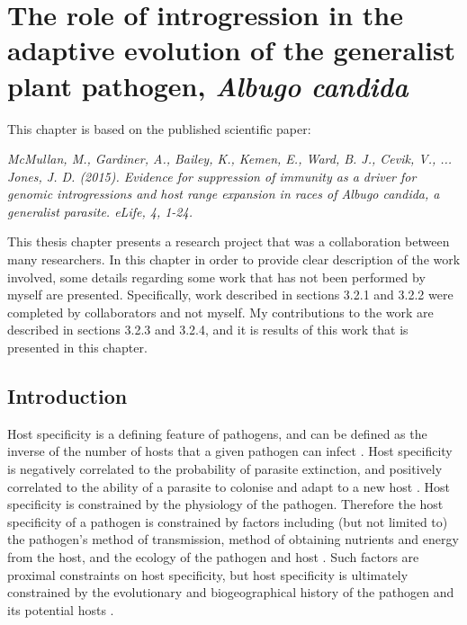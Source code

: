 \chapter{The role of introgression in the adaptive evolution of the generalist plant pathogen, \textit{Albugo candida}}
\label{chap:Acandida}

This chapter is based on the published scientific paper:

\vspace{5mm}

\textit{McMullan, M., Gardiner, A., Bailey, K., Kemen, E., Ward, B. J., Cevik, V., ... Jones, J. D. (2015). Evidence for suppression of immunity as a driver for genomic introgressions and host range expansion in races of Albugo candida, a generalist parasite. eLife, 4, 1-24.}

\vspace{5mm}

This thesis chapter presents a research project that was a collaboration between many researchers.
In this chapter in order to provide clear description of the work involved, some details regarding some work that has not been performed by myself are presented.
Specifically, work described in sections 3.2.1 and 3.2.2 were completed by collaborators and not myself.
My contributions to the work are described in sections 3.2.3 and 3.2.4, and it is results of this work that is presented in this chapter.


\newpage


\section{Introduction}
Host specificity is a defining feature of pathogens, and can be defined as the inverse of the number of hosts that a given pathogen can infect \parencite{Poulin2008}. Host specificity is negatively correlated to the probability of parasite extinction, and positively correlated to the ability of a parasite to colonise and adapt to a new host \parencite{Poulin2008}. Host specificity is constrained by the physiology of the pathogen. Therefore the host specificity of a pathogen is constrained by factors including (but not limited to) the pathogen's method of transmission, method of obtaining nutrients and energy from the host, and the ecology of the pathogen and host \parencite{poulin2011evolutionary}. Such factors are proximal constraints on host specificity, but host specificity is ultimately constrained by the evolutionary and biogeographical history of the pathogen and its potential hosts \parencite{Poulin2008,poulin2011evolutionary}.

